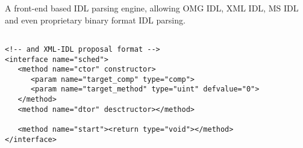 A front-end based IDL parsing engine, allowing OMG IDL,
XML IDL, MS IDL and even proprietary binary format IDL parsing.

\small
\begin{verbatim}

<!-- and XML-IDL proposal format -->
<interface name="sched">
   <method name="ctor" constructor>
      <param name="target_comp" type="comp">
      <param name="target_method" type="uint" defvalue="0">
   </method>
   <method name="dtor" desctructor></method>
   
   <method name="start"><return type="void"></method>
</interface>

\end{verbatim}
\normalsize
